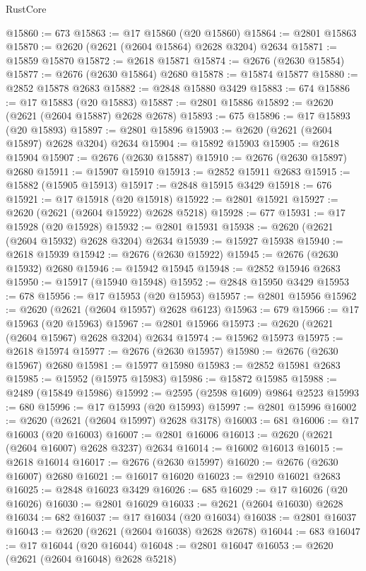 \begin{lexlean}{RustCore}
\begin{coremodule}
@15860 := 673
@15863 := @17 @15860 (@20 @15860)
@15864 := @2801 @15863
@15870 := @2620 (@2621 (@2604 @15864) @2628 @3204) @2634
@15871 := @15859 @15870
@15872 := @2618 @15871
@15874 := @2676 (@2630 @15854)
@15877 := @2676 (@2630 @15864) @2680
@15878 := @15874 @15877
@15880 := @2852 @15878 @2683
@15882 := @2848 @15880 @3429
@15883 := 674
@15886 := @17 @15883 (@20 @15883)
@15887 := @2801 @15886
@15892 := @2620 (@2621 (@2604 @15887) @2628 @2678)
@15893 := 675
@15896 := @17 @15893 (@20 @15893)
@15897 := @2801 @15896
@15903 := @2620 (@2621 (@2604 @15897) @2628 @3204) @2634
@15904 := @15892 @15903
@15905 := @2618 @15904
@15907 := @2676 (@2630 @15887)
@15910 := @2676 (@2630 @15897) @2680
@15911 := @15907 @15910
@15913 := @2852 @15911 @2683
@15915 := @15882 (@15905 @15913)
@15917 := @2848 @15915 @3429
@15918 := 676
@15921 := @17 @15918 (@20 @15918)
@15922 := @2801 @15921
@15927 := @2620 (@2621 (@2604 @15922) @2628 @5218)
@15928 := 677
@15931 := @17 @15928 (@20 @15928)
@15932 := @2801 @15931
@15938 := @2620 (@2621 (@2604 @15932) @2628 @3204) @2634
@15939 := @15927 @15938
@15940 := @2618 @15939
@15942 := @2676 (@2630 @15922)
@15945 := @2676 (@2630 @15932) @2680
@15946 := @15942 @15945
@15948 := @2852 @15946 @2683
@15950 := @15917 (@15940 @15948)
@15952 := @2848 @15950 @3429
@15953 := 678
@15956 := @17 @15953 (@20 @15953)
@15957 := @2801 @15956
@15962 := @2620 (@2621 (@2604 @15957) @2628 @6123)
@15963 := 679
@15966 := @17 @15963 (@20 @15963)
@15967 := @2801 @15966
@15973 := @2620 (@2621 (@2604 @15967) @2628 @3204) @2634
@15974 := @15962 @15973
@15975 := @2618 @15974
@15977 := @2676 (@2630 @15957)
@15980 := @2676 (@2630 @15967) @2680
@15981 := @15977 @15980
@15983 := @2852 @15981 @2683
@15985 := @15952 (@15975 @15983)
@15986 := @15872 @15985
@15988 := @2489 (@15849 @15986)
@15992 := @2595 (@2598 @1609) @9864 @2523
@15993 := 680
@15996 := @17 @15993 (@20 @15993)
@15997 := @2801 @15996
@16002 := @2620 (@2621 (@2604 @15997) @2628 @3178)
@16003 := 681
@16006 := @17 @16003 (@20 @16003)
@16007 := @2801 @16006
@16013 := @2620 (@2621 (@2604 @16007) @2628 @3237) @2634
@16014 := @16002 @16013
@16015 := @2618 @16014
@16017 := @2676 (@2630 @15997)
@16020 := @2676 (@2630 @16007) @2680
@16021 := @16017 @16020
@16023 := @2910 @16021 @2683
@16025 := @2848 @16023 @3429
@16026 := 685
@16029 := @17 @16026 (@20 @16026)
@16030 := @2801 @16029
@16033 := @2621 (@2604 @16030) @2628
@16034 := 682
@16037 := @17 @16034 (@20 @16034)
@16038 := @2801 @16037
@16043 := @2620 (@2621 (@2604 @16038) @2628 @2678)
@16044 := 683
@16047 := @17 @16044 (@20 @16044)
@16048 := @2801 @16047
@16053 := @2620 (@2621 (@2604 @16048) @2628 @5218)

\end{coremodule}
\end{lexlean}
